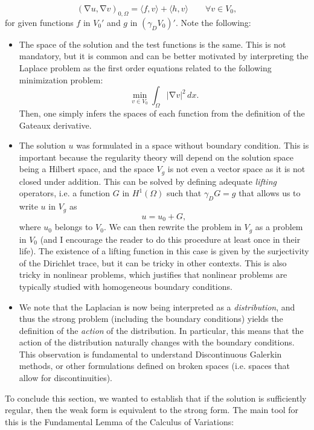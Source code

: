 \documentclass{article}
\DeclareMathOperator{\grad}{\nabla}
\begin{document}
    $$ (\grad u, \grad v)_{0,\Omega} = \langle f, v\rangle  + \langle h,  v\rangle \qquad \forall v\in V_0, $$
for given functions $f$ in $V_0'$ and $g$ in $(\gamma_D V_0)'$. Note the following: 
    \begin{itemize}
        \item The space of the solution and the test functions is the same. This is not mandatory, but it is common and can be better motivated by interpreting the Laplace problem as the first order equations related to the following minimization problem: 
            $$ \min_{v \in V_0} \int_\Omega |\grad v|^2\,dx . $$
        Then, one simply infers the spaces of each function from the definition of the Gateaux derivative. 
        \item The solution $u$ was formulated in a space without boundary condition. This is important because the regularity theory will depend on the solution space being a Hilbert space, and the space $V_g$ is not even a vector space as it is not closed under addition. This can be solved by defining adequate \emph{lifting} operators, i.e. a function $G$ in $H^1(\Omega)$ such that $\gamma_D G = g$ that allows us to write $u$ in $V_g$ as 
            $$ u = u_0 + G, $$
        where $u_0$ belongs to $V_0$. We can then rewrite the problem in $V_g$ as a problem in $V_0$ (and I encourage the reader to do this procedure at least once in their life). The existence of a lifting function in this case is given by the surjectivity of the Dirichlet trace, but it can be tricky in other contexts. This is also tricky in nonlinear problems, which justifies that nonlinear problems are typically studied with homogeneous boundary conditions.  
        \item We note that the Laplacian is now being interpreted as a \emph{distribution}, and thus the strong problem (including the boundary conditions) yields the definition of the \emph{action} of the distribution. In particular, this means that the action of the distribution naturally changes with the boundary conditions. This observation is fundamental to understand Discontinuous Galerkin methods, or other formulations defined on broken spaces (i.e. spaces that allow for discontinuities). 
    \end{itemize}

To conclude this section, we wanted to establish that if the solution is sufficiently regular, then the weak form is equivalent to the strong form. The main tool for this is the Fundamental Lemma of the Calculus of Variations: 
\end{document}
